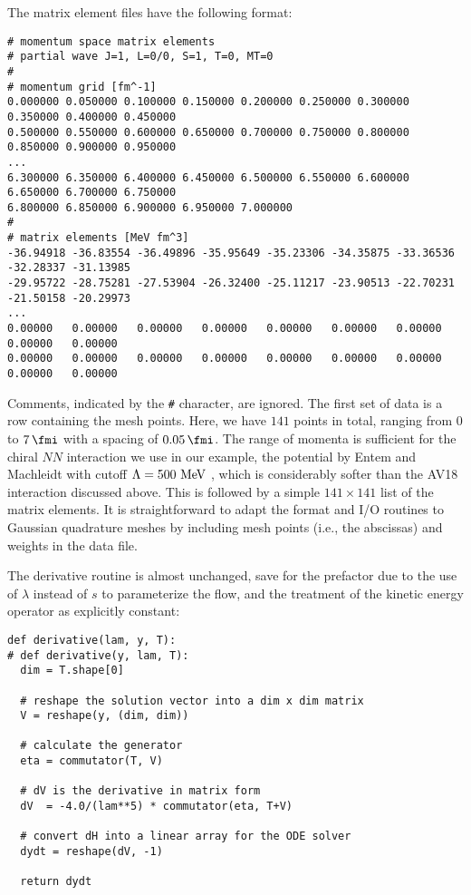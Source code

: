 The matrix element files have the following format:
\begin{lstlisting}
# momentum space matrix elements 
# partial wave J=1, L=0/0, S=1, T=0, MT=0 
# 
# momentum grid [fm^-1]
0.000000 0.050000 0.100000 0.150000 0.200000 0.250000 0.300000 0.350000 0.400000 0.450000 
0.500000 0.550000 0.600000 0.650000 0.700000 0.750000 0.800000 0.850000 0.900000 0.950000 
...
6.300000 6.350000 6.400000 6.450000 6.500000 6.550000 6.600000 6.650000 6.700000 6.750000 
6.800000 6.850000 6.900000 6.950000 7.000000 
#
# matrix elements [MeV fm^3] 
-36.94918 -36.83554 -36.49896 -35.95649 -35.23306 -34.35875 -33.36536 -32.28337 -31.13985 
-29.95722 -28.75281 -27.53904 -26.32400 -25.11217 -23.90513 -22.70231 -21.50158 -20.29973 
...
0.00000   0.00000   0.00000   0.00000   0.00000   0.00000   0.00000   0.00000   0.00000   
0.00000   0.00000   0.00000   0.00000   0.00000   0.00000   0.00000   0.00000   0.00000
\end{lstlisting}
Comments, indicated by the \texttt{\#} character, are ignored. The first set
of data is a row containing the mesh points. Here, we have $141$ points in total,
ranging from $0$ to $7\,\fmi$ with a spacing of $0.05\,\fmi$. The range of momenta
is sufficient for the chiral $NN$ interaction we use in our example, the \NNNLO{} 
potential by Entem and Machleidt with cutoff $\Lambda=500\,\,\text{MeV}$ \cite{Entem:2003th,Machleidt:2011bh}, 
which is considerably softer than the AV18 interaction discussed above. This is followed
by a simple $141 \times 141$ list of the matrix elements. It is straightforward
to adapt the format and I/O routines to Gaussian quadrature meshes by including
mesh points (i.e., the abscissas) and weights in the data file.

The derivative routine is almost unchanged, save for the prefactor due to the
use of $\lambda$ instead of $s$ to parameterize the flow, and the treatment of
the kinetic energy operator as explicitly constant:
\begin{lstlisting}
def derivative(lam, y, T):
# def derivative(y, lam, T):
  dim = T.shape[0]

  # reshape the solution vector into a dim x dim matrix
  V = reshape(y, (dim, dim))

  # calculate the generator
  eta = commutator(T, V)

  # dV is the derivative in matrix form 
  dV  = -4.0/(lam**5) * commutator(eta, T+V)

  # convert dH into a linear array for the ODE solver
  dydt = reshape(dV, -1)
    
  return dydt
\end{lstlisting}


